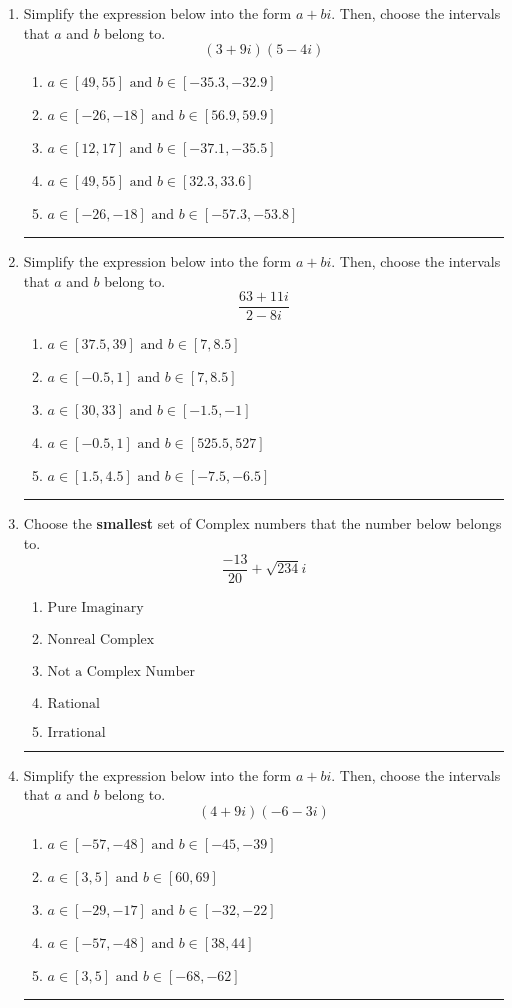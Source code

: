 \documentclass[14pt]{extbook}
\newcommand{\litem}[1]{\item#1\hspace*{-1cm}\rule{\textwidth}{0.4pt}}
\begin{document}
\begin{enumerate}
{\begin{enumerate}[label=\Alph*.]
\end{enumerate} }
\litem{
Simplify the expression below into the form $a+bi$. Then, choose the intervals that $a$ and $b$ belong to.\[ (3 + 9 i)(5 - 4 i) \]\begin{enumerate}[label=\Alph*.]
\item \( a \in [49, 55] \text{ and } b \in [-35.3, -32.9] \)
\item \( a \in [-26, -18] \text{ and } b \in [56.9, 59.9] \)
\item \( a \in [12, 17] \text{ and } b \in [-37.1, -35.5] \)
\item \( a \in [49, 55] \text{ and } b \in [32.3, 33.6] \)
\item \( a \in [-26, -18] \text{ and } b \in [-57.3, -53.8] \)

\end{enumerate} }
\litem{
Simplify the expression below into the form $a+bi$. Then, choose the intervals that $a$ and $b$ belong to.\[ \frac{63 + 11 i}{2 - 8 i} \]\begin{enumerate}[label=\Alph*.]
\item \( a \in [37.5, 39] \text{ and } b \in [7, 8.5] \)
\item \( a \in [-0.5, 1] \text{ and } b \in [7, 8.5] \)
\item \( a \in [30, 33] \text{ and } b \in [-1.5, -1] \)
\item \( a \in [-0.5, 1] \text{ and } b \in [525.5, 527] \)
\item \( a \in [1.5, 4.5] \text{ and } b \in [-7.5, -6.5] \)

\end{enumerate} }
\litem{
Choose the \textbf{smallest} set of Complex numbers that the number below belongs to.\[ \frac{-13}{20}+\sqrt{234} i \]\begin{enumerate}[label=\Alph*.]
\item \( \text{Pure Imaginary} \)
\item \( \text{Nonreal Complex} \)
\item \( \text{Not a Complex Number} \)
\item \( \text{Rational} \)
\item \( \text{Irrational} \)

\end{enumerate} }
\litem{
Simplify the expression below into the form $a+bi$. Then, choose the intervals that $a$ and $b$ belong to.\[ (4 + 9 i)(-6 - 3 i) \]\begin{enumerate}[label=\Alph*.]
\item \( a \in [-57, -48] \text{ and } b \in [-45, -39] \)
\item \( a \in [3, 5] \text{ and } b \in [60, 69] \)
\item \( a \in [-29, -17] \text{ and } b \in [-32, -22] \)
\item \( a \in [-57, -48] \text{ and } b \in [38, 44] \)
\item \( a \in [3, 5] \text{ and } b \in [-68, -62] \)


\end{enumerate}}
\end{enumerate}
\end{document}
